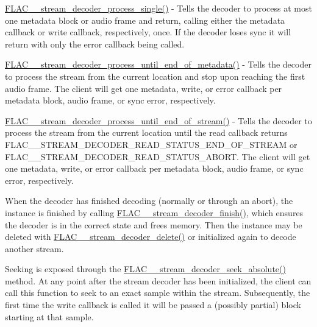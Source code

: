 \begin{DoxyItemize}
\item \hyperlink{group__flac__stream__decoder_ga8c4708eb2c5d99595f64dc2473aa2f42}{F\+L\+A\+C\+\_\+\+\_\+stream\+\_\+decoder\+\_\+process\+\_\+single()} -\/ Tells the decoder to process at most one metadata block or audio frame and return, calling either the metadata callback or write callback, respectively, once. If the decoder loses sync it will return with only the error callback being called.
\item \hyperlink{group__flac__stream__decoder_ga5e07ca9bf67dabf2521737f63b2156e2}{F\+L\+A\+C\+\_\+\+\_\+stream\+\_\+decoder\+\_\+process\+\_\+until\+\_\+end\+\_\+of\+\_\+metadata()} -\/ Tells the decoder to process the stream from the current location and stop upon reaching the first audio frame. The client will get one metadata, write, or error callback per metadata block, audio frame, or sync error, respectively.
\item \hyperlink{group__flac__stream__decoder_ga4544352442870ea9f16f388a97d81dff}{F\+L\+A\+C\+\_\+\+\_\+stream\+\_\+decoder\+\_\+process\+\_\+until\+\_\+end\+\_\+of\+\_\+stream()} -\/ Tells the decoder to process the stream from the current location until the read callback returns F\+L\+A\+C\+\_\+\+\_\+\+S\+T\+R\+E\+A\+M\+\_\+\+D\+E\+C\+O\+D\+E\+R\+\_\+\+R\+E\+A\+D\+\_\+\+S\+T\+A\+T\+U\+S\+\_\+\+E\+N\+D\+\_\+\+O\+F\+\_\+\+S\+T\+R\+E\+AM or F\+L\+A\+C\+\_\+\+\_\+\+S\+T\+R\+E\+A\+M\+\_\+\+D\+E\+C\+O\+D\+E\+R\+\_\+\+R\+E\+A\+D\+\_\+\+S\+T\+A\+T\+U\+S\+\_\+\+A\+B\+O\+RT. The client will get one metadata, write, or error callback per metadata block, audio frame, or sync error, respectively.
\end{DoxyItemize}

When the decoder has finished decoding (normally or through an abort), the instance is finished by calling \hyperlink{group__flac__stream__decoder_gaa51bb38f762ee11b320a0839f165c5ce}{F\+L\+A\+C\+\_\+\+\_\+stream\+\_\+decoder\+\_\+finish()}, which ensures the decoder is in the correct state and frees memory. Then the instance may be deleted with \hyperlink{group__flac__stream__decoder_gab958ee28b829be37e541946676ad9677}{F\+L\+A\+C\+\_\+\+\_\+stream\+\_\+decoder\+\_\+delete()} or initialized again to decode another stream.

Seeking is exposed through the \hyperlink{group__flac__stream__decoder_ga5c1c70de72e6ed49db6d61a9131d9117}{F\+L\+A\+C\+\_\+\+\_\+stream\+\_\+decoder\+\_\+seek\+\_\+absolute()} method. At any point after the stream decoder has been initialized, the client can call this function to seek to an exact sample within the stream. Subsequently, the first time the write callback is called it will be passed a (possibly partial) block starting at that sample.

